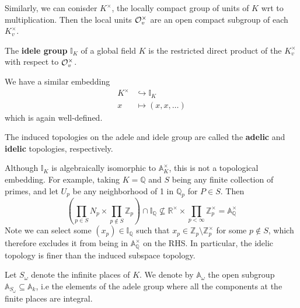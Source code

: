 \documentclass[11pt, x11names, openany]{book}
\newcommand{\zz}{\mathbb{Z}}
\newcommand{\qq}{\mathbb{Q}}
\newcommand{\rr}{\mathbb{R}}
\renewcommand{\aa}{\mathbb{A}}
\newcommand{\ii}{\mathbb{I}}
\newcommand{\inj}{\hookrightarrow}
\renewcommand{\brack}[1]{\left(   #1 \right)}
\begin{document}
Similarly, we can conisder $K^\times$, the locally compact group of units of $K$ wrt to multiplication. Then the local units $\mathcal{O}_v^\times$ are an open compact subgroup of each $K_v^\times$.
\begin{defn}
The \textbf{idele group} $\ii_K$ of a global field $K$ is the restricted direct product of the $K_v^\times$ with respect to $\mathcal{O}_v^\times$.
\end{defn}

We have a similar embedding
\begin{equation*}
    \begin{split}
    K^\times &\inj \ii_K\\
    x &\mapsto (x, x, \ldots)
    \end{split}
\end{equation*}
which is again well-defined.

The induced topologies on the adele and idele group are called the \textbf{adelic} and \textbf{idelic} topologies, respectively.

\begin{warning}
Although $\ii_K$ is algebraically isomorphic to $\aa_K^\times$, this is not a topological embedding. For example, taking $K = \qq$ and $S$ being any finite collection of primes, and let $U_p$ be any neighborhood of 1 in $\qq_p$ for $P \in S$. Then
\begin{equation*}
    \brack{\prod_{p \in S}N_p \times \prod_{p \notin S}\zz_p} \cap \ii_\qq \nsubseteq \rr^\times \times \prod_{p < \infty} \zz_p^\times = \aa_\qq^\times 
\end{equation*}
Note we can select some $(x_p) \in \ii_\qq$ such that $x_p \in \zz_p \setminus \zz_p^\times$ for some $p \notin S$, which therefore excludes it from being in $\aa_\qq^\times$ on the RHS. In particular, the idelic topology is finer than the induced subspace topology.
\end{warning}

Let $S_\omega$ denote the infinite places of $K$. We denote by $\aa_\omega$ the open subgroup $\aa_{S_\omega} \subseteq \aa_k$, i.e the elements of the adele group where all the components at the finite places are integral.
\end{document}
